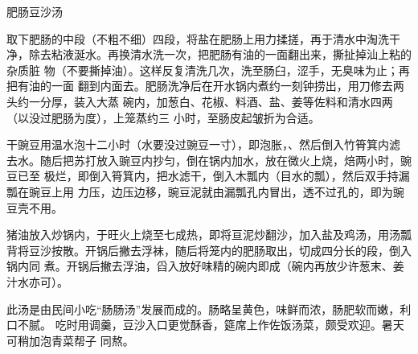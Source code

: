 \begin{recipe}{肥肠豆沙汤}

\ingredients


\preparation

\step 取下肥肠的中段（不粗不细）四段，将盐在肥肠上用力揉搓，再于清水中淘洗干
净，除去粘液涎水。再换清水洗一次，把肥肠有油的一面翻出来，撕扯掉汕上粘的杂质脏
物（不要撕掉油）。这样反复清洗几次，洗至肠臼，涩手，无臭味为止；再把有油的一面
翻到内面去。肥肠洗净后在开水锅内煮约一刻钟捞出，用刀修去两头约一分厚，装入大蒸
碗内，加葱白、花椒、料酒、盐、姜等佐料和清水四两（以没过肥肠为度），上笼蒸约三
小时，至肠皮起皱折为合适。

\step 干豌豆用温水泡十二小时（水要没过豌豆一寸），即泡胀，、然后倒入竹筲箕内滤
去水。随后把苏打放入豌豆内抄匀，倒在锅内加水，放在微火上烧，焙两小时，豌豆已至
极烂，即倒入筲箕内，把水滤干，倒入木瓢内（目水的瓢），然后双手持漏瓢在豌豆上用
力压，边压边移，豌豆泥就由漏瓢孔内冒出，透不过孔的，即为豌豆壳不用。

\step 猪油放入炒锅内，于旺火上烧至七成热，即将亘泥炒翻沙，加入盐及鸡汤，用汤瓢
背将豆沙按散。开锅后撇去浮袜，随后将笼内的肥肠取出，切成四分长的段，倒入锅内同
煮。开锅后撇去浮油，舀入放好味精的碗内即成（碗内再放少许葱末、姜汁水亦可）。

\features

此汤是由民间小吃“肠肠汤”发展而成的。肠略呈黄色，味鲜而浓，肠肥软而嫩，利口不腻。
吃时用调羹，豆沙入口更觉酥香，筵席上作佐饭汤菜，颇受欢迎。暑天可稍加泡青菜帮子
同熬。

\end{recipe}

